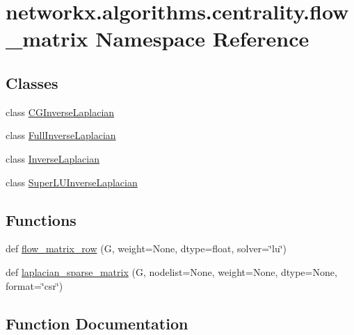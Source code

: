 \hypertarget{namespacenetworkx_1_1algorithms_1_1centrality_1_1flow__matrix}{}\section{networkx.\+algorithms.\+centrality.\+flow\+\_\+matrix Namespace Reference}
\label{namespacenetworkx_1_1algorithms_1_1centrality_1_1flow__matrix}
\subsection*{Classes}
\begin{DoxyCompactItemize}
\item 
class \hyperlink{classnetworkx_1_1algorithms_1_1centrality_1_1flow__matrix_1_1CGInverseLaplacian}{C\+G\+Inverse\+Laplacian}
\item 
class \hyperlink{classnetworkx_1_1algorithms_1_1centrality_1_1flow__matrix_1_1FullInverseLaplacian}{Full\+Inverse\+Laplacian}
\item 
class \hyperlink{classnetworkx_1_1algorithms_1_1centrality_1_1flow__matrix_1_1InverseLaplacian}{Inverse\+Laplacian}
\item 
class \hyperlink{classnetworkx_1_1algorithms_1_1centrality_1_1flow__matrix_1_1SuperLUInverseLaplacian}{Super\+L\+U\+Inverse\+Laplacian}
\end{DoxyCompactItemize}
\subsection*{Functions}
\begin{DoxyCompactItemize}
\item 
def \hyperlink{namespacenetworkx_1_1algorithms_1_1centrality_1_1flow__matrix_a2621851a66b964da99196dbd046c4fc7}{flow\+\_\+matrix\+\_\+row} (G, weight=None, dtype=float, solver=\char`\"{}lu\char`\"{})
\item 
def \hyperlink{namespacenetworkx_1_1algorithms_1_1centrality_1_1flow__matrix_a62d1a4ec478568934b9b3a23ca11f1eb}{laplacian\+\_\+sparse\+\_\+matrix} (G, nodelist=None, weight=None, dtype=None, format=\char`\"{}csr\char`\"{})
\end{DoxyCompactItemize}


\subsection{Function Documentation}
\mbox{\label{namespacenetworkx_1_1algorithms_1_1centrality_1_1flow__matrix_a2621851a66b964da99196dbd046c4fc7}} 
